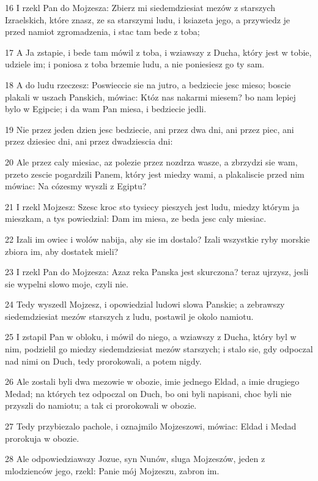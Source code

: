 \par 16 I rzekl Pan do Mojzesza: Zbierz mi siedemdziesiat mezów z starszych Izraelskich, które znasz, ze sa starszymi ludu, i ksiazeta jego, a przywiedz je przed namiot zgromadzenia, i stac tam bede z toba;
\par 17 A Ja zstapie, i bede tam mówil z toba, i wziawszy z Ducha, który jest w tobie, udziele im; i poniosa z toba brzemie ludu, a nie poniesiesz go ty sam.
\par 18 A do ludu rzeczesz: Poswieccie sie na jutro, a bedziecie jesc mieso; boscie plakali w uszach Panskich, mówiac: Któz nas nakarmi miesem? bo nam lepiej bylo w Egipcie; i da wam Pan miesa, i bedziecie jedli.
\par 19 Nie przez jeden dzien jesc bedziecie, ani przez dwa dni, ani przez piec, ani przez dziesiec dni, ani przez dwadziescia dni:
\par 20 Ale przez caly miesiac, az polezie przez nozdrza wasze, a zbrzydzi sie wam, przeto zescie pogardzili Panem, który jest miedzy wami, a plakaliscie przed nim mówiac: Na cózesmy wyszli z Egiptu?
\par 21 I rzekl Mojzesz: Szesc kroc sto tysiecy pieszych jest ludu, miedzy którym ja mieszkam, a tys powiedzial: Dam im miesa, ze beda jesc caly miesiac.
\par 22 Izali im owiec i wolów nabija, aby sie im dostalo? Izali wszystkie ryby morskie zbiora im, aby dostatek mieli?
\par 23 I rzekl Pan do Mojzesza: Azaz reka Panska jest skurczona? teraz ujrzysz, jesli sie wypelni slowo moje, czyli nie.
\par 24 Tedy wyszedl Mojzesz, i opowiedzial ludowi slowa Panskie; a zebrawszy siedemdziesiat mezów starszych z ludu, postawil je okolo namiotu.
\par 25 I zstapil Pan w obloku, i mówil do niego, a wziawszy z Ducha, który byl w nim, podzielil go miedzy siedemdziesiat mezów starszych; i stalo sie, gdy odpoczal nad nimi on Duch, tedy prorokowali, a potem nigdy.
\par 26 Ale zostali byli dwa mezowie w obozie, imie jednego Eldad, a imie drugiego Medad; na których tez odpoczal on Duch, bo oni byli napisani, choc byli nie przyszli do namiotu; a tak ci prorokowali w obozie.
\par 27 Tedy przybiezalo pachole, i oznajmilo Mojzeszowi, mówiac: Eldad i Medad prorokuja w obozie.
\par 28 Ale odpowiedziawszy Jozue, syn Nunów, sluga Mojzeszów, jeden z mlodzienców jego, rzekl: Panie mój Mojzeszu, zabron im.
